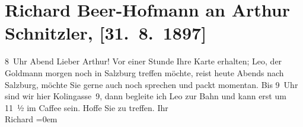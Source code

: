 

         
         \renewcommand{\erwaehntePersonen}{Personen: Paul Goldmann, Leo Van-Jung}
         \renewcommand{\erwaehnteOrte}{Orte: Café Arkaden, Kolingasse, Salzburg, Wien}
         \renewcommand{\erwaehnteWerke}{}
               \section[Richard Beer-Hofmann an Arthur Schnitzler, {[}31. 8. 1897{]}]{ Richard Beer-Hofmann an Arthur Schnitzler, {[}31. 8. 1897{]}}\nopagebreak{}\rehead{ }\begin{ledgroupsized}[t]{13cm}\normalsize\beginnumbering \toendnotes[C]{\smallbreak\pagebreak[2]} 
\toendnotes[C]{\smallbreak}\pstart
           \raggedleft{}{\pb}8 Uhr Abend\pend
           \pstart
           Lieber Arthur! Vor einer Stunde Ihre Karte erhalten; Leo, der Goldmann
               morgen noch in Salzburg treffen möchte, reist
               heute Abends nach Salzburg, möchte
               Sie gerne auch noch sprechen und packt momentan. Bis 9 Uhr
                sind wir
               hier Kolingasse 9, dann begleite ich Leo zur Bahn und kann erst um 11 ½ im
                  Caffee
                sein. Hoffe Sie zu treffen.\pend
           \pstart
           Ihr{\\[\baselineskip]}\spacefill\mbox{Richard}\pend
           \leftskip=0em{}
         
         \endnumbering{}\end{ledgroupsized}  \newcommand{\dateiname}{L00720}\newcommand{\titel}{Richard Beer-Hofmann an Arthur Schnitzler, [31. 8. 1897]}\newcommand{\editorInnen}{Martin Anton Müller und Gerd-Hermann Susen}
      